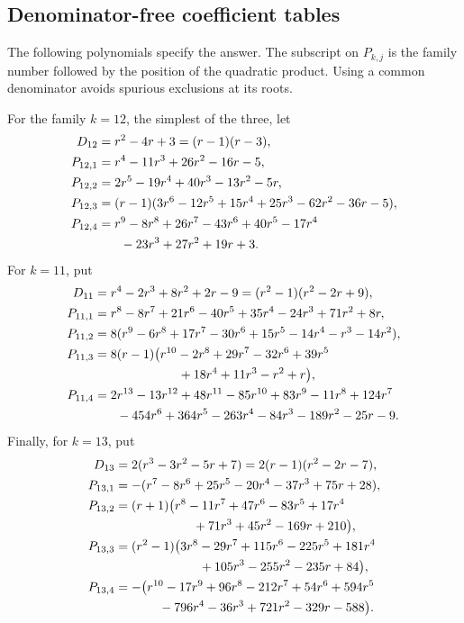 \documentclass[11pt,letterpaper]{article}
\numberwithin{equation}{section}
\theoremstyle{definition}
\begin{document}
\subsection{Denominator-free coefficient tables}

The following polynomials specify the answer. The subscript on \(P_{k,j}\)
is the family number followed by the position of the quadratic product.
Using a common denominator avoids spurious exclusions at its roots.

For the family \(k=12\), the simplest of the three, let
\begin{align}
 D_{12}&=r^2-4r+3=(r-1)(r-3),\label{eq:D12}\\
 P_{12,1}&=r^4-11r^3+26r^2-16r-5,\label{eq:P121}\\
 P_{12,2}&=2r^5-19r^4+40r^3-13r^2-5r,\label{eq:P122}\\
 P_{12,3}&=(r-1)(3r^6-12r^5+15r^4+25r^3-62r^2-36r-5),\label{eq:P123}\\
 P_{12,4}&=r^9-8r^8+26r^7-43r^6+40r^5-17r^4\notag\\
 &\hspace{1.8em}{}-23r^3+27r^2+19r+3.\label{eq:P124}
\end{align}
For \(k=11\), put
\begin{align}
 D_{11}&=r^4-2r^3+8r^2+2r-9
       =(r^2-1)(r^2-2r+9),\label{eq:D11}\\
 P_{11,1}&=r^8-8r^7+21r^6-40r^5+35r^4-24r^3+71r^2+8r,\\
 P_{11,2}&=8(r^9-6r^8+17r^7-30r^6+15r^5-14r^4-r^3-14r^2),\\
 P_{11,3}&=8(r-1)\bigl(r^{10}-2r^8+29r^7-32r^6+39r^5\notag\\
 &\hspace{6.7em}{}+18r^4+11r^3-r^2+r\bigr),\\
 P_{11,4}&=2r^{13}-13r^{12}+48r^{11}-85r^{10}+83r^9-11r^8
             +124r^7\notag\\
 &\hspace{1.8em}{}-454r^6+364r^5-263r^4-84r^3-189r^2-25r-9.
 \label{eq:P11last}
\end{align}
Finally, for \(k=13\), put
\begin{align}
 D_{13}&=2(r^3-3r^2-5r+7)=2(r-1)(r^2-2r-7),\label{eq:D13}\\
 P_{13,1}&=-(r^7-8r^6+25r^5-20r^4-37r^3+75r+28),\\
 P_{13,2}&=(r+1)\bigl(r^8-11r^7+47r^6-83r^5+17r^4\notag\\
 &\hspace{6.2em}{}+71r^3+45r^2-169r+210\bigr),\\
 P_{13,3}&=(r^2-1)\bigl(3r^8-29r^7+115r^6-225r^5+181r^4\notag\\
 &\hspace{6.7em}{}+105r^3-255r^2-235r+84\bigr),\\
 P_{13,4}&=-\bigl(r^{10}-17r^9+96r^8-212r^7+54r^6+594r^5\notag\\
 &\hspace{3.5em}{}-796r^4-36r^3+721r^2-329r-588\bigr).
 \label{eq:P13last}
\end{align}
\end{document}
